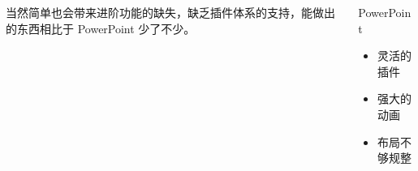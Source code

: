 \begin{frame}
\begin{columns}[t]
{\begin{column}{0.25\textwidth}
{          当然简单也会带来进阶功能的缺失，缺乏插件体系的支持，能做出的东西相比于 PowerPoint 少了不少。}
      \end{column}
    }

    \begin{column}{0.25\textwidth}
      \begin{exampleblock}{\faFilePowerpoint{} PowerPoint}
        \begin{itemize}
          \item[\faPlus] 灵活的插件
          \item[\faPlus] 强大的动画
          \item[\faMinus] 布局不够规整
        \end{itemize}
      \end{exampleblock}
    \end{column}
  \end{columns}
\end{frame}

